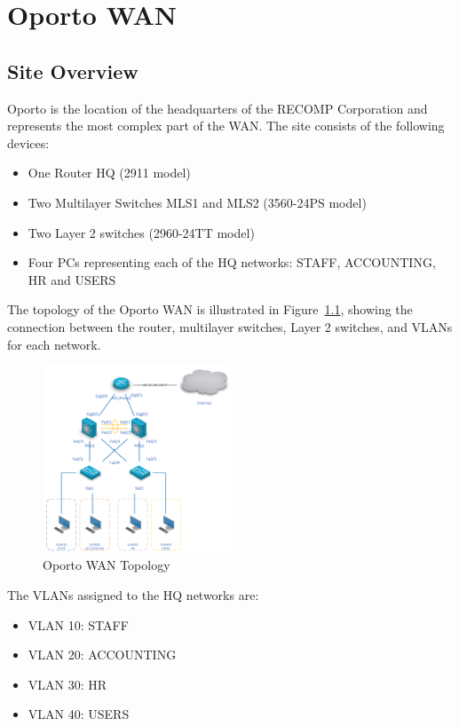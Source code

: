 \chapter{Oporto WAN}

\section{Site Overview}

Oporto is the location of the headquarters of the \ac{RECOMP} Corporation and represents the most complex part of the \ac{WAN}. The site consists of the following devices:

\begin{itemize}
    \item One Router HQ (2911 model)
    \item Two Multilayer Switches MLS1 and MLS2 (3560-24PS model)
    \item Two Layer 2 switches (2960-24TT model)
    \item Four PCs representing each of the HQ networks: STAFF, ACCOUNTING, HR and USERS
\end{itemize}

The topology of the Oporto \ac{WAN} is illustrated in Figure~\ref{fig:opo-topology}, showing the connection between the router, multilayer switches, Layer 2 switches, and \ac{VLAN}s for each network.


\begin{figure}[!htb]
\centering
\includegraphics[width=0.5\textwidth]{figures/opo-topology.png}
\caption{Oporto WAN Topology\cite{recomp_sprint1}}
\label{fig:opo-topology}
\end{figure}


The \ac{VLAN}s assigned to the HQ networks are:

\begin{itemize}
    \item \ac{VLAN} 10: STAFF
    \item \ac{VLAN} 20: ACCOUNTING
    \item \ac{VLAN} 30: HR
    \item \ac{VLAN} 40: USERS
\end{itemize}

